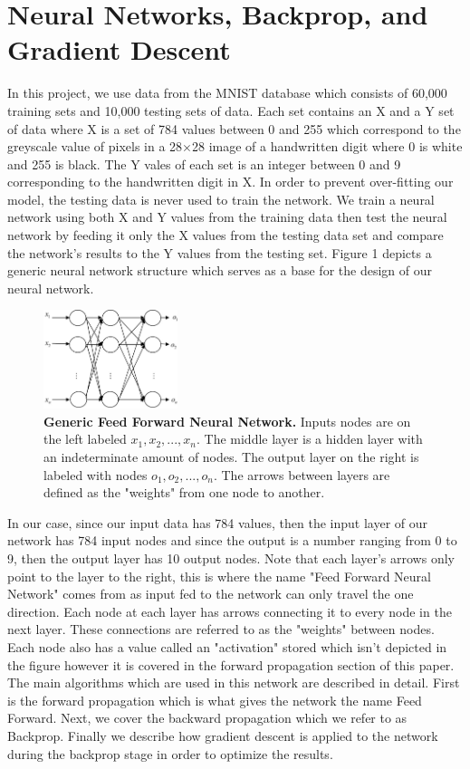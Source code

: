 \documentclass[12pt]{article}
\theoremstyle{definition}
\theoremstyle{plain}
\begin{document}
\section{Neural Networks, Backprop, and Gradient Descent}
In this project, we use data from the MNIST database which consists of 60,000 training sets and 10,000 testing sets of data\cite{mnist}. Each set contains an X and a Y set of data where X is a set of 784 values between 0 and 255 which correspond to the greyscale value of pixels in a 28$\times$28 image of a handwritten digit where 0 is white and 255 is black. The Y vales of each set is an integer between 0 and 9 corresponding to the handwritten digit in X. In order to prevent over-fitting our model, the testing data is never used to train the network. We train a neural network using both X and Y values from the training data then test the neural network by feeding it only the X values from the testing data set and compare the network's results to the Y values from the testing set. Figure 1 depicts a generic neural network structure which serves as a base for the design of our neural network.
\begin{figure}
	\centering
	\includegraphics[width=0.35\textwidth]{Images/FFNN.jpg}
	\caption{\textbf{Generic Feed Forward Neural Network.} Inputs nodes are on the left labeled $x_1,x_2,...,x_n$. The middle layer is a hidden layer with an indeterminate amount of nodes. The output layer on the right is labeled with nodes $o_1,o_2,...,o_n$. The arrows between layers are defined as the "weights" from one node to another.}
	\label{fig:FFNN}
\end{figure}
In our case, since our input data has 784 values, then the input layer of our network has 784 input nodes and since the output is a number ranging from 0 to 9, then the output layer has 10 output nodes. Note that each layer's arrows only point to the layer to the right, this is where the name "Feed Forward Neural Network" comes from as input fed to the network can only travel the one direction. Each node at each layer has arrows connecting it to every node in the next layer. These connections are referred to as the "weights" between nodes. Each node also has a value called an "activation" stored which isn't depicted in the figure however it is covered in the forward propagation section of this paper. The main algorithms which are used in this network are described in detail. First is the forward propagation which is what gives the network the name Feed Forward. Next, we cover the backward propagation which we refer to as Backprop. Finally we describe how gradient descent is applied to the network during the backprop stage in order to optimize the results.
\end{document}
